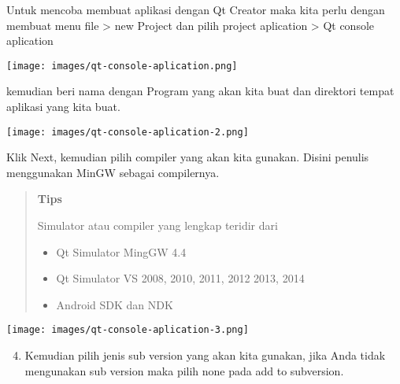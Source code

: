   Untuk mencoba membuat aplikasi dengan Qt Creator maka kita perlu
  dengan membuat menu file \textgreater{} new Project dan pilih project
  aplication \textgreater{} Qt console aplication

  \begin{center}

  \texttt{[image: images/qt-console-aplication.png]}

  \end{center}

  kemudian beri nama dengan Program yang akan kita buat dan direktori
  tempat aplikasi yang kita buat.

  \begin{center}

  \texttt{[image: images/qt-console-aplication-2.png]}

  \end{center}

  Klik Next, kemudian pilih compiler yang akan kita gunakan. Disini
  penulis menggunakan MinGW sebagai compilernya.


\begin{quotation}
	\textbf{Tips}
	
	Simulator 	 atau compiler yang lengkap teridir dari
	
	\begin{itemize}
		
		\item
		Qt Simulator MingGW 4.4
		\item
		Qt Simulator VS 2008, 2010, 2011, 2012 2013, 2014
		\item
		Android SDK dan NDK
	\end{itemize}
\end{quotation}




\begin{center}

\texttt{[image: images/qt-console-aplication-3.png]}

\end{center}

\begin{enumerate}

\setcounter{enumi}{3}

\item
  Kemudian pilih jenis sub version yang akan kita gunakan, jika Anda
  tidak mengunakan sub version maka pilih none pada add to subversion.
\end{enumerate}

